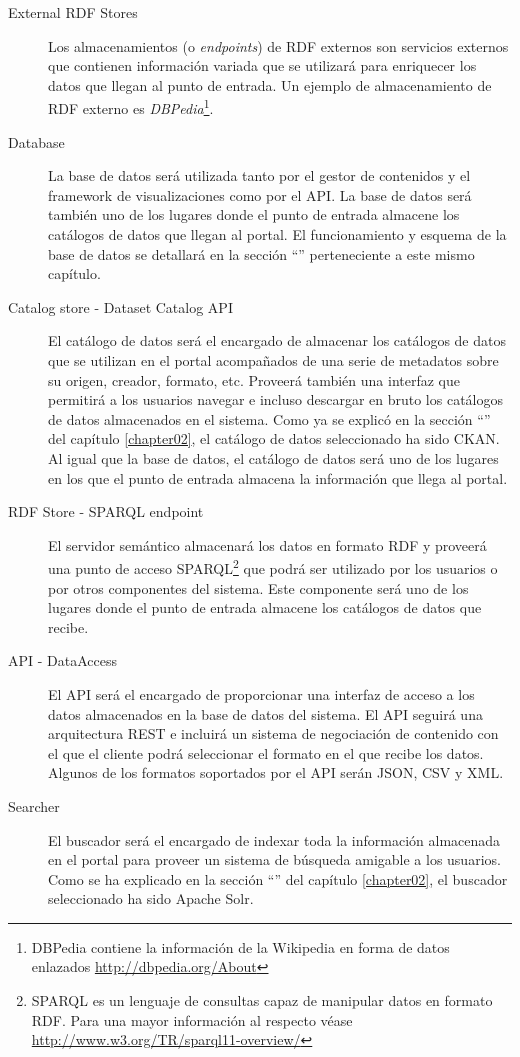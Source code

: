 \begin{description}
	\item[External RDF Stores]  Los almacenamientos (o \textit{endpoints}) de RDF externos son servicios externos que contienen información variada que se utilizará para enriquecer los datos que llegan al punto de entrada.  Un ejemplo de almacenamiento de RDF externo es \textit{DBPedia}\footnote{DBPedia contiene la información de la Wikipedia en forma de datos enlazados \url{http://dbpedia.org/About}}.
	\item[Database]  La base de datos será utilizada tanto por el gestor de contenidos y el framework de visualizaciones como por el API.  La base de datos será también uno de los lugares donde el punto de entrada almacene los catálogos de datos que llegan al portal.  El funcionamiento y esquema de la base de datos se detallará en la sección ``'' perteneciente a este mismo capítulo.
	\item[Catalog store - Dataset Catalog API]  El catálogo de datos será el encargado de almacenar los catálogos de datos que se utilizan en el portal acompañados de una serie de metadatos sobre su origen, creador, formato, etc.  Proveerá también una interfaz que permitirá a los usuarios navegar e incluso descargar en bruto los catálogos de datos almacenados en el sistema.  Como ya se explicó en la sección ``'' del capítulo \ref{chapter02}, el catálogo de datos seleccionado ha sido CKAN.  Al igual que la base de datos, el catálogo de datos será uno de los lugares en los que el punto de entrada almacena la información que llega al portal.
	\item[RDF Store - SPARQL endpoint]  El servidor semántico almacenará los datos en formato RDF y proveerá una punto de acceso SPARQL\footnote{SPARQL es un lenguaje de consultas capaz de manipular datos en formato RDF.  Para una mayor información al respecto véase \url{http://www.w3.org/TR/sparql11-overview/}} que podrá ser utilizado por los usuarios o por otros componentes del sistema.  Este componente será uno de los lugares donde el punto de entrada almacene los catálogos de datos que recibe.
	\item[API - DataAccess]  El API será el encargado de proporcionar una interfaz de acceso a los datos almacenados en la base de datos del sistema.  El API seguirá una arquitectura REST e incluirá un sistema de negociación de contenido con el que el cliente podrá seleccionar el formato en el que recibe los datos.  Algunos de los formatos soportados por el API serán JSON, CSV y XML.
	\item[Searcher]  El buscador será el encargado de indexar toda la información almacenada en el portal para proveer un sistema de búsqueda amigable a los usuarios.  Como se ha explicado en la sección ``'' del capítulo \ref{chapter02}, el buscador seleccionado ha sido Apache Solr.

\end{description}
